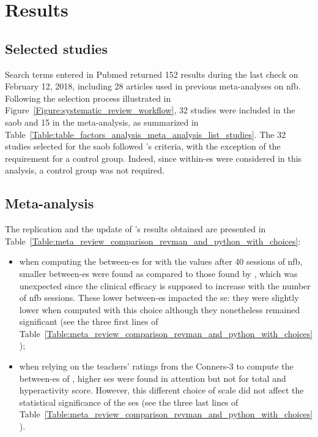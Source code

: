 


\section{Results}

\subsection{Selected studies}

Search terms entered in Pubmed returned 152 results during the last check on February 12, 2018, including 28 
articles used in previous meta-analyses on \gls{nfb}. Following the selection process illustrated 
in Figure~\ref{Figure:systematic_review_workflow}, 32 studies were included in the \gls{saob} and 15 in the meta-analysis, 
as summarized in Table~\ref{Table:table_factors_analysis_meta_analysis_list_studies}. The 32 studies selected for the \gls{saob} 
followed \citeauthor{Cortese2016}'s criteria, with the exception of the requirement for a control group. 
Indeed, since within-\gls{es} were considered in this analysis, a control group was not required.

\subsection{Meta-analysis}

The replication and the update of \citeauthor{Cortese2016}'s results obtained are presented 
in Table~\ref{Table:meta_review_comparison_revman_and_python_with_choices}:

\begin{itemize}
    \item when computing the between-\gls{es} for \citet{Arnold2014} with the values after 40 sessions of \gls{nfb}, 
      smaller between-\gls{es} were found as compared to those found by \citet{Cortese2016}, which was unexpected since  
			the clinical efficacy is supposed to increase with the number of \gls{nfb} sessions. These lower between-\gls{es}
			impacted the \gls{se}: they were slightly lower when computed with this choice although they nonetheless remained significant (see the three first lines 
			of Table~\ref{Table:meta_review_comparison_revman_and_python_with_choices});  
    \item when relying on the teachers' ratings from the Conners-3 to compute the between-\gls{es} of \citet{Steiner2014}, 
		higher \glspl{se} were found in attention but not for total and hyperactivity score. However, this different choice of 
		scale did not affect the statistical significance of the \glspl{se} (see the three last lines 
			of Table~\ref{Table:meta_review_comparison_revman_and_python_with_choices}).
\end{itemize}

